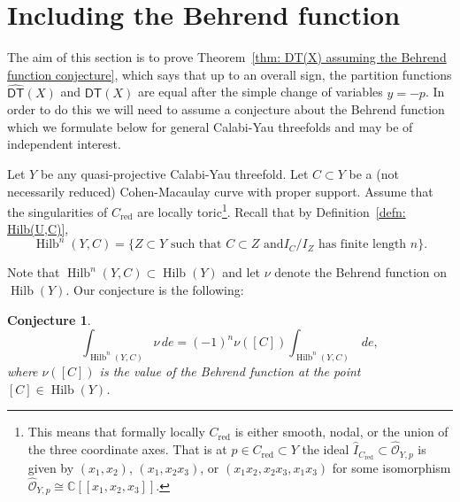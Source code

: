 \documentclass[12pt]{amsart}
\newtheorem{conjecture}[theorem]{Conjecture}
\theoremstyle{definition}
\newcommand{\CC} {\mathbb{C}}          %
\newcommand{\Hilb}{\operatorname{Hilb}}
\newcommand{\DT}{\mathsf{DT}}
\newcommand{\DThat}{\widehat{\DT}}
\newcommand{\red}{\mathrm{red}}
\newcommand{\presectionspace}{\vspace{0.2cm}} %
\begin{document}
\presectionspace
\section{Including the Behrend function} \label{sec: Behrend}

The aim of this section is to prove Theorem~\ref{thm: DT(X) assuming
the Behrend function conjecture}, which says that up to an overall
sign, the partition functions $\DThat (X)$ and $\DT (X)$ are equal
after the simple change of variables $y=-p$. In order to do this we
will need to assume a conjecture about the Behrend function which we
formulate below for general Calabi-Yau threefolds and may be of
independent interest.

Let $Y$ be any quasi-projective Calabi-Yau
threefold.  Let $C\subset Y$ be a (not necessarily reduced)
Cohen-Macaulay curve with proper support. Assume that the
singularities of $C_{\red}$ are locally toric\footnote{This means that
formally locally $C_{\red}$ is either smooth, nodal, or the union of
the three coordinate axes. That is at $p\in C_{\red}\subset Y$ the
ideal $\widehat{I}_{C_{\red}}\subset \widehat{\mathcal{O}}_{Y,p}$ is
given by $(x_{1},x_{2})$, $(x_{1},x_{2}x_{3})$, or
$(x_{1}x_{2},x_{2}x_{3},x_{1}x_{3})$ for some isomorphism
$\widehat{\mathcal{O}}_{Y,p}\cong \CC
[[x_{1},x_{2},x_{3}]]$. }. Recall that by Definition~\ref{defn:
Hilb(U,C)}, 
\[
\Hilb^{n}(Y,C) = \{Z\subset Y \text{ such that $C\subset Z$ and
$I_{C}/I_{Z}$ has finite length $n$} \}.
\]

Note that $\Hilb^{n}(Y,C)\subset \Hilb (Y)$ and let $\nu$ denote the
Behrend function on $\Hilb (Y)$. Our conjecture is the following:

\begin{conjecture}\label{conj: Behrend fnc conj}
\[
\int_{\Hilb^{n}(Y,C)} \nu \, de = (-1)^{n} \nu ([C]) \int_{\Hilb^{n}(Y,C)} \, de,
\]
where $\nu ([C])$ is the value of the Behrend function at the point $[C]\in \Hilb (Y)$.
\end{conjecture}
\end{document}
